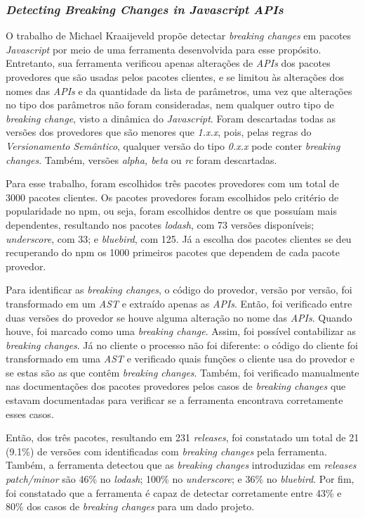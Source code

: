 \subsubsection{\textit{Detecting Breaking Changes in Javascript APIs}}
O trabalho de Michael Kraaijeveld propõe detectar \textit{breaking changes} em pacotes \textit{Javascript} por meio de uma ferramenta desenvolvida para esse propósito. Entretanto, sua ferramenta verificou apenas alterações de \textit{APIs} dos pacotes provedores que são usadas pelos pacotes clientes, e se limitou às alterações dos nomes das \textit{APIs} e da quantidade da lista de parâmetros, uma vez que alterações no tipo dos parâmetros não foram consideradas, nem qualquer outro tipo de \textit{breaking change}, visto a dinâmica do \textit{Javascript}. Foram descartadas todas as versões dos provedores que são menores que \textit{1.x.x}, pois, pelas regras do \textit{Versionamento Semântico}, qualquer versão do tipo \textit{0.x.x} pode conter \textit{breaking changes}. Também, versões \textit{alpha, beta} ou \textit{rc} foram descartadas.

Para esse trabalho, foram escolhidos três pacotes provedores com um total de 3000 pacotes clientes. Os pacotes provedores foram escolhidos pelo critério de popularidade no \gls{npm}, ou seja, foram escolhidos dentre os que possuíam mais dependentes, resultando nos pacotes \textit{lodash}, com 73 versões disponíveis; \textit{underscore}, com 33; e \textit{bluebird}, com 125. Já a escolha dos pacotes clientes se deu recuperando do \gls{npm} os 1000 primeiros pacotes que dependem de cada pacote provedor.

Para identificar as \textit{breaking changes}, o código do provedor, versão por versão, foi transformado em um \textit{AST} e extraído apenas as \textit{APIs}. Então, foi verificado entre duas versões do provedor se houve alguma alteração no nome das \textit{APIs}. Quando houve, foi marcado como uma \textit{breaking change}. Assim, foi possível contabilizar as \textit{breaking changes}. Já no cliente o processo não foi diferente: o código do cliente foi transformado em uma \textit{AST} e verificado quais funções o cliente usa do provedor e se estas são as que contêm \textit{breaking changes}. Também, foi verificado manualmente nas documentações dos pacotes provedores pelos casos de \textit{breaking changes} que estavam documentadas para verificar se a ferramenta encontrava corretamente esses casos.

Então, dos três pacotes, resultando em 231 \textit{releases}, foi constatado um total de 21 (9.1\%) de versões com identificadas com \textit{breaking changes} pela ferramenta. Também, a ferramenta detectou que as \textit{breaking changes} introduzidas em \textit{releases patch/minor} são 46\% no \textit{lodash}; 100\% no \textit{underscore}; e 36\% no \textit{bluebird}. Por fim, foi constatado que a ferramenta é capaz de detectar corretamente entre 43\% e 80\% dos casos de \textit{breaking changes} para um dado projeto.

